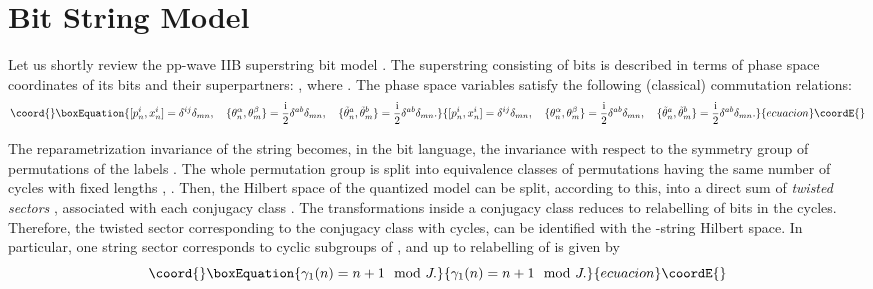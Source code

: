 \documentclass[a4paper]{article}
\providecommand{\ii}{\mathrm{i}}
\providecommand{\hh}{\mathcal{H}}
\providecommand{\q}{\tilde{\theta}}
\begin{document}
\section{Bit String Model}
Let us shortly review the pp-wave IIB superstring bit model
\cite{Verlinde:2002ig}. The superstring consisting of \coordHE{} bits is
described in terms of phase space coordinates  of its bits and
their superpartners: \myHighlight{$\{p^i_n,x^i_n, \theta^a_n, \q^a_n\}$}\coordHE{}, where
\coordHE{}. The phase space variables satisfy the following
(classical) commutation relations:
\begin{equation}\coord{}\boxEquation{\label{PB}
  [p^i_n,x^i_n]=\delta^{ij}\delta_{mn},\quad
  \{\theta^\alpha_n,\theta^\beta_m\}=\frac{\ii}{2}\delta^{ab}\delta_{mn},\quad
  \{\q^a_n,\q^b_m\}=\frac{\ii}{2}\delta^{ab}\delta_{mn}.
}{[p^i_n,x^i_n]=\delta^{ij}\delta_{mn},\quad
  \{\theta^\alpha_n,\theta^\beta_m\}=\frac{\ii}{2}\delta^{ab}\delta_{mn},\quad
  \{\q^a_n,\q^b_m\}=\frac{\ii}{2}\delta^{ab}\delta_{mn}.
}{ecuacion}\coordE{}\end{equation}

The reparametrization invariance of the string becomes, in the bit
language, the invariance with respect to the symmetry group \coordHE{}
of permutations of the labels \coordHE{}. The whole permutation group
\coordHE{} is split into equivalence classes \myHighlight{$[\gamma]$}\coordHE{} of permutations
having the same number of cycles with fixed lengths
\coordHE{}, \coordHE{}. Then, the Hilbert space of the
quantized model can be split, according to this, into a direct sum
of \emph{twisted sectors} \myHighlight{$\hh_\gamma$}\coordHE{}, associated with each
conjugacy class \myHighlight{$[\gamma]$}\coordHE{}. The transformations inside a conjugacy
class reduces to relabelling of bits in the cycles. Therefore, the
twisted sector corresponding to the conjugacy class \myHighlight{$[\gamma_s]$}\coordHE{}
with \coordHE{} cycles, can be identified with the \coordHE{}-string Hilbert
space. In particular, one string sector corresponds to cyclic
subgroups of \coordHE{}, and up to relabelling of \coordHE{} is given by
\begin{equation}\coord{}\boxEquation{\label{gamma}
  \gamma_1(n)=n+1 \mod J.
}{\gamma_1(n)=n+1 \mod J.
}{ecuacion}\coordE{}\end{equation}
\end{document}
